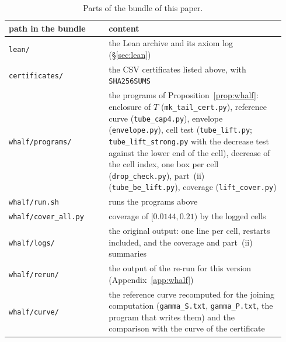 \documentclass[11pt,a4paper]{article}
\theoremstyle{definition}
\theoremstyle{remark}
\newcommand{\code}[1]{\texttt{#1}}
\begin{document}
\begin{table}[ht]\centering\small
\begin{tabular}{@{}p{0.34\linewidth}p{0.6\linewidth}@{}}
\toprule
path in the bundle & content \\
\midrule
\code{lean/} & the Lean archive and its axiom log (\S\ref{sec:lean}) \\
\code{certificates/} & the CSV certificates listed above, with \code{SHA256SUMS} \\
\code{whalf/programs/} & the programs of Proposition~\ref{prop:whalf}: enclosure of $T$ (\code{mk\_tail\_cert.py}), reference curve (\code{tube\_cap4.py}), envelope (\code{envelope.py}), cell test (\code{tube\_lift.py}; \code{tube\_lift\_strong.py} with the decrease test against the lower end of the cell), decrease of the cell index, one box per cell (\code{drop\_check.py}), part~(ii) (\code{tube\_be\_lift.py}), coverage (\code{lift\_cover.py}) \\
\code{whalf/run.sh} & runs the programs above \\
\code{whalf/cover\_all.py} & coverage of $[0.0144,0.21)$ by the logged cells \\
\code{whalf/logs/} & the original output: one line per cell, restarts included, and the coverage and part~(ii) summaries \\
\code{whalf/rerun/} & the output of the re-run for this version (Appendix~\ref{app:whalf}) \\
\code{whalf/curve/} & the reference curve recomputed for the joining computation (\code{gamma\_S.txt}, \code{gamma\_P.txt}, the program that writes them) and the comparison with the curve of the certificate \\
\bottomrule
\end{tabular}
\caption{Parts of the bundle of this paper.}\label{tab:bundle}
\end{table}
\end{document}
